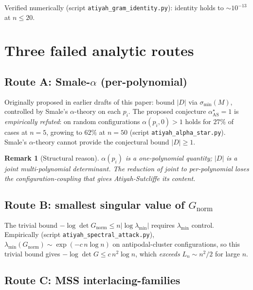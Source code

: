 \documentclass[11pt,a4paper]{article}
\newtheorem{remark}[theorem]{Remark}
\begin{document}
Verified numerically (script \verb|atiyah_gram_identity.py|): identity holds
to $\sim 10^{-13}$ at $n \le 20$.

\section{Three failed analytic routes}\label{sec:failed-routes}

\subsection{Route A: Smale-$\alpha$ (per-polynomial)}\label{sec:alpha-route}

Originally proposed in earlier drafts of this paper: bound $|D|$ via
$\sigma_{\min}(M)$, controlled by Smale's $\alpha$-theory on each $p_i$.
The proposed conjecture $\alpha^\star_{\mathrm{AS}} = 1$ is \emph{empirically refuted}:
on random configurations $\alpha(p_i, 0) > 1$ holds for $27\%$ of cases at
$n = 5$, growing to $62\%$ at $n = 50$ (script \verb|atiyah_alpha_star.py|).
Smale's $\alpha$-theory cannot provide the conjectural bound $|D| \ge 1$.

\begin{remark}[Structural reason]
$\alpha(p_i)$ is a one-polynomial quantity; $|D|$ is a joint multi-polynomial determinant.
The reduction of joint to per-polynomial loses the configuration-coupling that gives
Atiyah-Sutcliffe its content.
\end{remark}

\subsection{Route B: smallest singular value of $G_{\mathrm{norm}}$}\label{sec:sigma-route}

The trivial bound $-\log\det G_{\mathrm{norm}} \le n |\log \lambda_{\min}|$ requires
$\lambda_{\min}$ control. Empirically (script \verb|atiyah_spectral_attack.py|),
$\lambda_{\min}(G_{\mathrm{norm}}) \sim \exp(-c\, n \log n)$ on antipodal-cluster
configurations, so this trivial bound gives $-\log\det G \le c\,n^2 \log n$,
which \emph{exceeds} $L_n \sim n^2/2$ for large $n$.

\subsection{Route C: MSS interlacing-families}\label{sec:mss-route}
\end{document}
